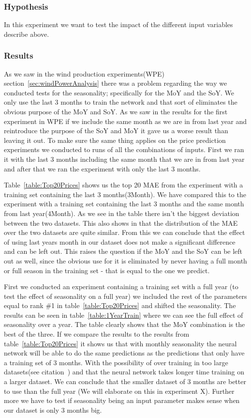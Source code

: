 \subsubsection{Hypothesis}
In this experiment we want to test the impact of the different input variables describe above.

\subsubsection{Results}
As we saw in the wind production experiments(WPE) section~\ref{sec:windPowerAnalysis} there was a problem regarding the way we conducted tests for the seasonality; specifically for the MoY and the SoY. We only use the last 3 months to train the network and that sort of eliminates the obvious purpose of the MoY and SoY. As we saw in the results for the first experiment in WPE if we include the same month as we are in from last year and reintroduce the purpose of the SoY and MoY it gave us a worse result than leaving it out. To make sure the same thing applies on the price prediction experiments we conducted to runs of all the combinations of inputs. First we ran it with the last 3 months including the same month that we are in from last year and after that we ran the experiment with only the last 3 months.

Table~\ref{table:Top20Prices} shows us the top 20 MAE from the experiment with a training set containing the last 3 months(3Month). We have compared this to the experiment with a training set containing the last 3 months and the same month from last year(4Month). As we see in the table there isn't the biggest deviation between the two datasets. This also shows in  that the distribution of the MAE over the two datasets are quite similar. From this we can conclude that the effect of using last years month in our dataset does not make a significant difference and can be left out. This raises the question if the MoY and the SoY can be left out as well, since the obvious use for it is eliminated by never having a full month or full season in the training set - that is equal to the one we predict.

First we conducted an experiment containing a training set with a full year (to test the effect of seasonality on a full year) we included the rest of the parameters equal to rank \#1 in table~\ref{table:Top20Prices} and shifted the seasonality. The results can be seen in table~\ref{table:1YearTrain} where we can see the full effect of seasonality over a year. The table clearly shows that the MoY combination is the best of the three. If we compare the results to the results from table~\ref{table:Top20Prices} it shows us that with monthly seasonality the neural network will be able to do the same predictions as the predictions that only have a training set of 3 months. With the possibility of over training in too large datasets(see citation~\cite{1}) and that the neural network takes longer time training on a larger dataset. We can conclude that the smaller dataset of 3 months are better to use than the full year (We will elaborate on this in experiment X). Further more we have to test if seasonality being an input parameter makes sense when our dataset is only 3 months big. 

